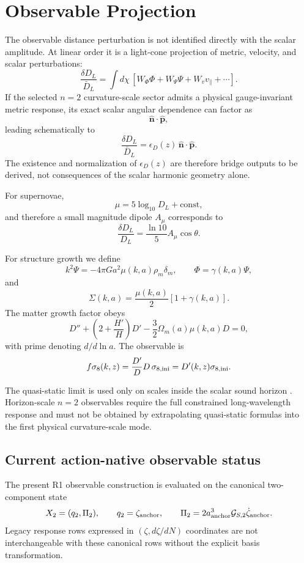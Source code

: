 
\section{Observable Projection}

The observable distance perturbation is not identified directly with the scalar amplitude. At linear order it is a light-cone projection of metric, velocity, and scalar perturbations:
\[
\frac{\delta D_L}{\bar D_L}
=
\int d\chi\,
\left[
W_\Phi\Phi+
W_\Psi\Psi+
W_vv_\parallel+\cdots
\right].
\]
If the selected \(n=2\) curvature-scale sector admits a physical gauge-invariant metric response, its exact scalar angular dependence can factor as
\[
\hat{\mathbf n}\cdot\hat{\mathbf p},
\]
leading schematically to
\[
\frac{\delta D_L}{\bar D_L}
=
\epsilon_D(z)\,
\hat{\mathbf n}\cdot\hat{\mathbf p}.
\]
The existence and normalization of \(\epsilon_D(z)\) are therefore bridge outputs to be derived, not consequences of the scalar harmonic geometry alone.

For supernovae,
\[
\mu=5\log_{10}D_L+\mathrm{const},
\]
and therefore a small magnitude dipole \(A_\mu\) corresponds to
\[
\frac{\delta D_L}{D_L}
=
\frac{\ln10}{5}A_\mu\cos\theta.
\]

For structure growth we define
\[
k^2\Psi
=
-4\pi Ga^2\mu(k,a)\rho_m\delta_m,
\qquad
\Phi=\gamma(k,a)\Psi,
\]
and
\[
\Sigma(k,a)
=
\frac{\mu(k,a)}2[1+\gamma(k,a)].
\]
The matter growth factor obeys
\[
D''+
\left(2+\frac{H'}H\right)D'
-\frac32\Omega_m(a)\mu(k,a)D=0,
\]
with prime denoting \(d/d\ln a\). The observable is
\[
f\sigma_8(k,z)
=
\frac{D'}{D}D\,\sigma_{8,\rm ini}
=
D'(k,z)\sigma_{8,\rm ini}.
\]

The quasi-static limit is used only on scales inside the scalar sound horizon \citep{SawickiBellini2015}. Horizon-scale \(n=2\) observables require the full constrained long-wavelength response and must not be obtained by extrapolating quasi-static formulas into the first physical curvature-scale mode.

\subsection{Current action-native observable status}
\label{sec:r1-observable-status-v15}

The present R1 observable construction is evaluated on the canonical
two-component state
\[
X_2=(q_2,\Pi_2),
\qquad
q_2=\zeta_{\rm anchor},
\qquad
\Pi_2=2a_{\rm anchor}^3\mathcal G_{S,2}\dot\zeta_{\rm anchor}.
\]
Legacy response rows expressed in $(\zeta,d\zeta/dN)$ coordinates are not
interchangeable with these canonical rows without the explicit basis
transformation.

